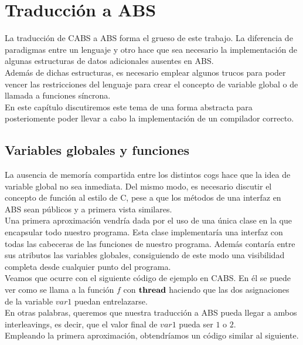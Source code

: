 \chapter{Traducción a ABS}
La traducción de CABS a ABS forma el grueso de este trabajo. La diferencia de paradigmas entre un lenguaje y otro hace que sea necesario la implementación de algunas estructuras de datos adicionales ausentes en ABS.\\

Además de dichas estructuras, es necesario emplear algunos trucos para poder vencer las restricciones del lenguaje para crear el concepto de variable global o de llamada a funciones síncrona.\\

En este capítulo discutiremos este tema de una forma abstracta para posteriomente poder llevar a cabo la implementación de un compilador correcto.

\section{Variables globales y funciones}
La ausencia de memoría compartida entre los distintos cogs hace que la idea de variable global no sea inmediata. Del mismo modo, es necesario discutir el concepto de función al estilo de C, pese a que los métodos de una interfaz en ABS sean públicos y a primera vista similares.\\

Una primera aproximación vendría dada por el uso de una única clase en la que encapsular todo nuestro programa. Esta clase implementaría una interfaz con todas las cabeceras de las funciones de nuestro programa. Además contaría entre sus atributos las variables globales, consiguiendo de este modo una visibilidad completa desde cualquier punto del programa.\\

Veamos que ocurre con el siguiente código de ejemplo en CABS. En él se puede ver como se llama a la función $f$ con $\textbf{thread}$ haciendo que las dos asignaciones de la variable $var1$ puedan entrelazarse.\\



En otras palabras, queremos que nuestra traducción a ABS pueda llegar a ambos interleavings, es decir, que el valor final de $var1$ pueda ser $1$ o $2$.\\

Empleando la primera aproximación, obtendríamos un código similar al siguiente.

